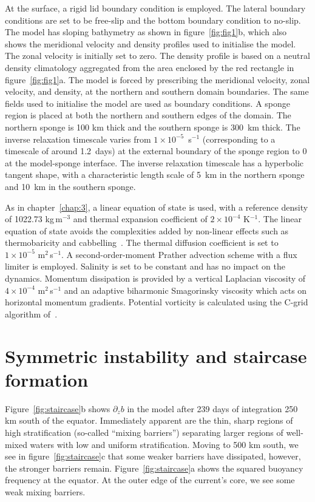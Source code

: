 At the surface, a rigid lid boundary condition is employed. The lateral boundary conditions are set to be free-slip and the bottom boundary condition to no-slip. The model has sloping bathymetry as shown in figure~\ref{fig:fig1}b, which also shows the meridional velocity and density profiles used to initialise the model. The zonal velocity is initially set to zero. The density profile is based on a neutral density climatology aggregated from the area enclosed by the red rectangle in figure~\ref{fig:fig1}a. The model is forced by prescribing the meridional velocity, zonal velocity, and density, at the northern and southern domain boundaries. The same fields used to initialise the model are used as boundary conditions. A sponge region is placed at both the northern and southern edges of the domain. The northern sponge is 100 km thick and the southern sponge is 300~km thick. The inverse relaxation timescale varies from $1\times 10^{-5}$~s$^{-1}$ (corresponding to a timescale of around 1.2~days) at the external boundary of the sponge region to 0 at the model-sponge interface. The inverse relaxation timescale has a hyperbolic tangent shape, with a characteristic length scale of 5~km in the northern sponge and 10~km in the southern sponge.

As in chapter~\ref{chap:3}, a linear equation of state is used, with a reference density of 1022.73 kg\,m$^{-3}$ and thermal expansion coefficient of $2 \times 10^{-4}$ K$^{-1}$. The linear equation of state avoids the complexities added by non-linear effects such as thermobaricity and cabbelling~\citep[e.g.][]{Groeskamp2016}. The thermal diffusion coefficient is set to $1 \times 10^{-5}$ m$^{2}$\,s$^{-1}$. A second-order-moment Prather advection scheme with a flux limiter is employed. Salinity is set to be constant and has no impact on the dynamics. Momentum dissipation is provided by a vertical Laplacian viscosity of $4 \times 10^{-4}$ m$^{2}$\,s$^{-1}$ and an adaptive biharmonic Smagorinsky viscosity which acts on horizontal momentum gradients. Potential vorticity is calculated using the C-grid algorithm of~\citet{Morel2019}.

\section{Symmetric instability and staircase formation}
\label{sec:randd}
Figure~\ref{fig:staircase}b shows $\partial_z b$ in the model after 239 days of integration 250 km south of the equator. Immediately apparent are the thin, sharp regions of high stratification (so-called ``mixing barriers'') separating larger regions of well-mixed waters with low and uniform stratification. Moving to 500 km south, we see in figure~\ref{fig:staircase}c that some weaker barriers have dissipated, however, the stronger barriers remain. Figure~\ref{fig:staircase}a shows the squared buoyancy frequency at the equator. At the outer edge of the current's core, we see some weak mixing barriers.

